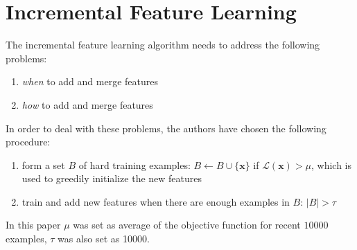 \documentclass[a4paper,twocolumn]{article}
\begin{document}
\section{Incremental Feature Learning}
The incremental feature learning algorithm needs to address the following problems:
\begin{enumerate}
    \item \textit{when} to add and merge features
    \item \textit{how} to add and merge features
\end{enumerate}
In order to deal with these problems, the authors have chosen the following procedure:
\begin{enumerate}
    \item form a set $B$ of hard training examples: $B \leftarrow B \cup \{\textbf{x}\}$ if $\mathcal{L}(\textbf{x}) > \mu$, which is used to greedily initialize the new features
    \item train and add new features when there are enough examples in $B$: $|B| > \tau$
\end{enumerate}
In this paper $\mu$ was set as average of the objective function for recent $10000$ examples, $\tau$ was also set as 10000.
\end{document}
